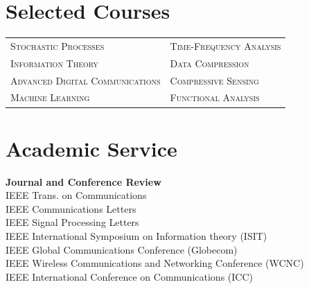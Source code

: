 \documentclass[a4paper,10pt]{article}
\begin{document}
\section{Selected Courses}
\begin{tabular}{ll}	
\vspace{2 mm}
 \textsc{Stochastic Processes}  & \textsc{Time-Frequency Analysis} \\
\vspace{2 mm}
 \textsc{Information Theory}  &\textsc{Data Compression} \\
\vspace{2 mm}
 \textsc{Advanced Digital Communications}  & \textsc{Compressive Sensing} \\
\vspace{2 mm}
\textsc{Machine Learning} & \textsc{Functional Analysis}  \\

\end{tabular}

\section{Academic Service}
\textbf{Journal and Conference Review}\\
IEEE Trans. on Communications\\
  IEEE Communications Letters\\
  IEEE Signal Processing Letters \\
  IEEE International Symposium on Information theory (ISIT)\\
  IEEE Global Communications Conference (Globecom)\\
  IEEE Wireless Communications and Networking Conference (WCNC)\\
  IEEE International Conference on Communications (ICC)\\
\end{document}
